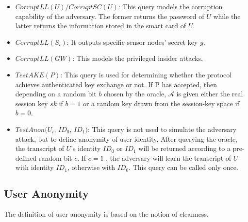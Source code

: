 \documentclass[a4paper,12pt]{report}
\begin{document}
\begin{itemize}
\item $CorruptLL(U)$/$CorruptSC(U)$: This query models the corruption
capability of the adversary. The former returns the password of $U$
while the latter returns the information stored in the smart card of
$U$.

\item $CorruptLL(S_i)$: It outputs specific sensor nodes' secret key $y$.

\item $CorruptLL(GW)$: This models the privileged insider attacks.

\item $TestAKE(P)$: This query is used for determining whether the protocol
achieves authenticated key exchange or not. If P has accepted, then
depending on a random bit $b$ chosen by the oracle, $\mathcal{A}$ is
given either the real session key $sk$ if $b = 1$ or a random key
drawn from the session-key space if $b = 0$.

\item $TestAnon(U_{i}$, $ID_{0}$, $ID_{1})$: This query is not used to simulate
the adversary attack, but to define anonymity of user identity.
After querying the oracle, the transcript of $U$'s identity $ID_0$
or $ID_1$ will be returned according to a pre-defined random bit
$c$. If $c=1$ , the adversary will learn the transcript of $U$ with
identity $ID_1$, otherwise with $ID_0$. This query can be called
only once.
\end{itemize}



\subsection{User Anonymity}

The definition of user anonymity is based on the notion of cleanness.
\end{document}
